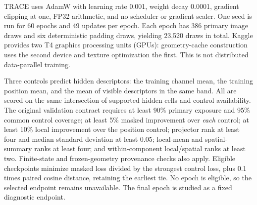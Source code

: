 TRACE uses AdamW with learning rate 0.001, weight decay 0.0001, gradient clipping at one, FP32 arithmetic, and no scheduler or gradient scaler. One seed is run for 60 epochs and 49 updates per epoch. Each epoch has 386 primary image draws and six deterministic padding draws, yielding 23,520 draws in total. Kaggle provides two T4 graphics processing units (GPUs): geometry-cache construction uses the second device and texture optimization the first. This is not distributed data-parallel training.

Three controls predict hidden descriptors: the training channel mean, the training position mean, and the mean of visible descriptors in the same band. All are scored on the same intersection of supported hidden cells and control availability. The original validation contract requires at least 90\% primary exposure and 95\% common control coverage; at least 5\% masked improvement over \emph{each} control; at least 10\% local improvement over the position control; projector rank at least four and median standard deviation at least 0.05; local-mean and spatial-summary ranks at least four; and within-component local/spatial ranks at least two. Finite-state and frozen-geometry provenance checks also apply. Eligible checkpoints minimize masked loss divided by the strongest control loss, plus 0.1 times paired cosine distance, retaining the earliest tie. No epoch is eligible, so the selected endpoint remains unavailable. The final epoch is studied as a fixed diagnostic endpoint.
